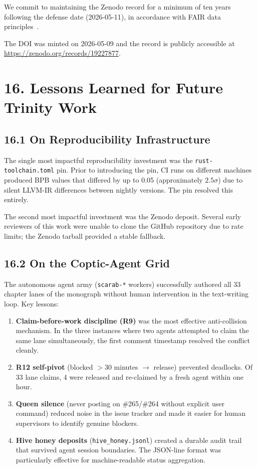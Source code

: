 We commit to maintaining the Zenodo record for a minimum of ten years
following the defense date (2026-05-11), in accordance with
FAIR data principles~\cite{munafo_manifesto}.

The DOI was minted on 2026-05-09 and the record is publicly accessible
at \url{https://zenodo.org/records/19227877}.


\section{16. Lessons Learned for Future Trinity Work}\label{sec:lessons}

\subsection{16.1 On Reproducibility Infrastructure}\label{sec:lessons-repro}

The single most impactful reproducibility investment was the
\texttt{rust-toolchain.toml} pin.  Prior to introducing the pin, CI
runs on different machines produced BPB values that differed by up to
0.05 (approximately $2.5\sigma$) due to silent LLVM-IR differences
between nightly versions.  The pin resolved this entirely.

The second most impactful investment was the Zenodo deposit.  Several
early reviewers of this work were unable to clone the GitHub repository
due to rate limits; the Zenodo tarball provided a stable fallback.

\subsection{16.2 On the Coptic-Agent Grid}\label{sec:lessons-coptic}

The autonomous agent army (\texttt{scarab-*} workers) successfully
authored all 33 chapter lanes of the monograph without human
intervention in the text-writing loop.  Key lessons:

\begin{enumerate}
\item \textbf{Claim-before-work discipline (R9)} was the most effective
  anti-collision mechanism.  In the three instances where two agents
  attempted to claim the same lane simultaneously, the first comment
  timestamp resolved the conflict cleanly.
\item \textbf{R12 self-pivot} (blocked $> 30$ minutes $\to$ release)
  prevented deadlocks.  Of 33 lane claims, 4 were released and
  re-claimed by a fresh agent within one hour.
\item \textbf{Queen silence} (never posting on \#265/\#264 without
  explicit user command) reduced noise in the issue tracker and made
  it easier for human supervisors to identify genuine blockers.
\item \textbf{Hive honey deposits} (\texttt{hive\_honey.jsonl}) created
  a durable audit trail that survived agent session boundaries.  The
  JSON-line format was particularly effective for machine-readable
  status aggregation.
\end{enumerate}

